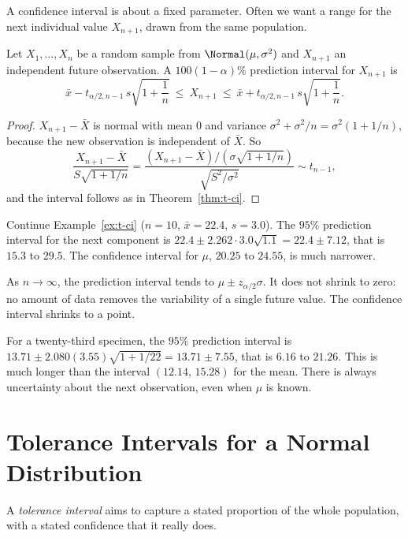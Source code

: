 A confidence interval is about a fixed parameter. Often we want a range for the next individual value $X_{n+1}$, drawn from the same population.

\begin{theorem}\label{thm:pi}
Let $X_1,\dots,X_n$ be a random sample from $\Normal(\mu,\sigma^2)$ and $X_{n+1}$ an independent future observation. A $100(1-\alpha)\%$ prediction interval for $X_{n+1}$ is
\[ \bar{x}-t_{\alpha/2,n-1}\,s\sqrt{1+\frac1n}\ \le\ X_{n+1}\ \le\ \bar{x}+t_{\alpha/2,n-1}\,s\sqrt{1+\frac1n}. \]
\end{theorem}

\begin{proof}
$X_{n+1}-\bar{X}$ is normal with mean $0$ and variance $\sigma^2+\sigma^2/n=\sigma^2(1+1/n)$, because the new observation is independent of $\bar{X}$. So
\[ \frac{X_{n+1}-\bar{X}}{S\sqrt{1+1/n}}=\frac{(X_{n+1}-\bar{X})/(\sigma\sqrt{1+1/n})}{\sqrt{S^2/\sigma^2}}\sim t_{n-1}, \]
and the interval follows as in Theorem~\ref{thm:t-ci}.
\end{proof}

\begin{example}
Continue Example~\ref{ex:t-ci} ($n=10$, $\bar{x}=22.4$, $s=3.0$). The $95\%$ prediction interval for the next component is $22.4\pm2.262\cdot3.0\sqrt{1.1}=22.4\pm7.12$, that is $15.3$ to $29.5$. The confidence interval for $\mu$, $20.25$ to $24.55$, is much narrower.
\end{example}

As $n\to\infty$, the prediction interval tends to $\mu\pm z_{\alpha/2}\sigma$. It does not shrink to zero: no amount of data removes the variability of a single future value. The confidence interval shrinks to a point.

\begin{example}
For a twenty-third specimen, the $95\%$ prediction interval is $13.71\pm2.080(3.55)\sqrt{1+1/22}=13.71\pm7.55$, that is $6.16$ to $21.26$. This is much longer than the interval $(12.14,\,15.28)$ for the mean. There is always uncertainty about the next observation, even when $\mu$ is known.
\end{example}

\section{Tolerance Intervals for a Normal Distribution}

A \emph{tolerance interval} aims to capture a stated proportion of the whole population, with a stated confidence that it really does.

